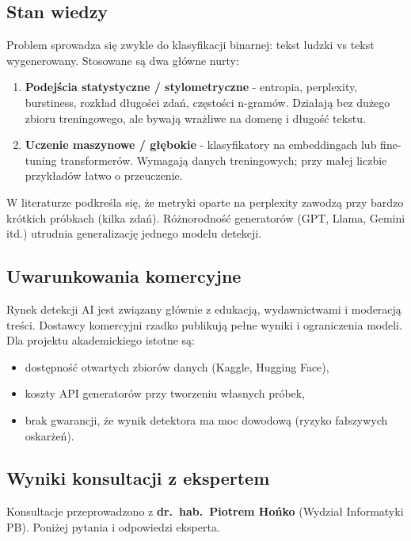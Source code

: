 \subsection{Stan wiedzy}

Problem sprowadza się zwykle do klasyfikacji binarnej: tekst ludzki vs tekst wygenerowany. Stosowane są dwa główne nurty:

\begin{enumerate}
	\item \textbf{Podejścia statystyczne / stylometryczne} - entropia, perplexity, burstiness, rozkład długości zdań, częstości n-gramów. Działają bez dużego zbioru treningowego, ale bywają wrażliwe na domenę i długość tekstu.
	\item \textbf{Uczenie maszynowe / głębokie} - klasyfikatory na embeddingach lub fine-tuning transformerów. Wymagają danych treningowych; przy małej liczbie przykładów łatwo o przeuczenie.
\end{enumerate}

W literaturze podkreśla się, że metryki oparte na perplexity zawodzą przy bardzo krótkich próbkach (kilka zdań). Różnorodność generatorów (GPT, Llama, Gemini itd.) utrudnia generalizację jednego modelu detekcji.

\subsection{Uwarunkowania komercyjne}

Rynek detekcji AI jest związany głównie z edukacją, wydawnictwami i moderacją treści. Dostawcy komercyjni rzadko publikują pełne wyniki i ograniczenia modeli. Dla projektu akademickiego istotne są:

\begin{itemize}
	\item dostępność otwartych zbiorów danych (Kaggle, Hugging Face),
	\item koszty API generatorów przy tworzeniu własnych próbek,
	\item brak gwarancji, że wynik detektora ma moc dowodową (ryzyko fałszywych oskarżeń).
\end{itemize}

\subsection{Wyniki konsultacji z ekspertem}

Konsultacje przeprowadzono z \textbf{dr.\ hab.\ Piotrem Hońko} (Wydział Informatyki PB). Poniżej pytania i odpowiedzi eksperta.

